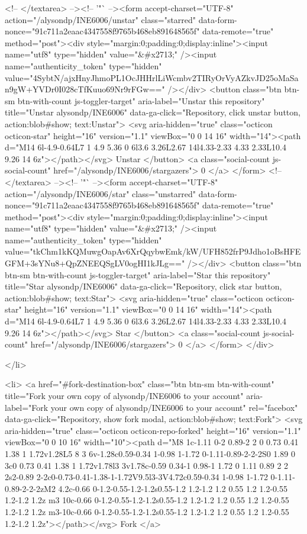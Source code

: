     <!-- </textarea> --><!-- '"` --><form accept-charset="UTF-8" action="/alysondp/INE6006/unstar" class="starred" data-form-nonce="91c711a2eaac4347558f9765b468eb891648565f" data-remote="true" method="post"><div style="margin:0;padding:0;display:inline"><input name="utf8" type="hidden" value="&#x2713;" /><input name="authenticity_token" type="hidden" value="4SybtN/ajxHnyJhmoPL1OcJHHrlLiWcmbv2TIRyOrVyAZkvJD25oMaSan9gW+YVDr0I028cTfKuuo69Nr9rFGw==" /></div>
      <button
        class="btn btn-sm btn-with-count js-toggler-target"
        aria-label="Unstar this repository" title="Unstar alysondp/INE6006"
        data-ga-click="Repository, click unstar button, action:blob#show; text:Unstar">
        <svg aria-hidden="true" class="octicon octicon-star" height="16" version="1.1" viewBox="0 0 14 16" width="14"><path d="M14 6l-4.9-0.64L7 1 4.9 5.36 0 6l3.6 3.26L2.67 14l4.33-2.33 4.33 2.33L10.4 9.26 14 6z"></path></svg>
        Unstar
      </button>
        <a class="social-count js-social-count" href="/alysondp/INE6006/stargazers">
          0
        </a>
</form>
    <!-- </textarea> --><!-- '"` --><form accept-charset="UTF-8" action="/alysondp/INE6006/star" class="unstarred" data-form-nonce="91c711a2eaac4347558f9765b468eb891648565f" data-remote="true" method="post"><div style="margin:0;padding:0;display:inline"><input name="utf8" type="hidden" value="&#x2713;" /><input name="authenticity_token" type="hidden" value="tkChm1kKQMuwgOapAv6XrQqybwEmk/kW/UFH852frP9Jdho1oBsHFEGFM+3sYNu8+QpZNEEQSgLV0ogHI1kJLg==" /></div>
      <button
        class="btn btn-sm btn-with-count js-toggler-target"
        aria-label="Star this repository" title="Star alysondp/INE6006"
        data-ga-click="Repository, click star button, action:blob#show; text:Star">
        <svg aria-hidden="true" class="octicon octicon-star" height="16" version="1.1" viewBox="0 0 14 16" width="14"><path d="M14 6l-4.9-0.64L7 1 4.9 5.36 0 6l3.6 3.26L2.67 14l4.33-2.33 4.33 2.33L10.4 9.26 14 6z"></path></svg>
        Star
      </button>
        <a class="social-count js-social-count" href="/alysondp/INE6006/stargazers">
          0
        </a>
</form>  </div>

  </li>

  <li>
          <a href="#fork-destination-box" class="btn btn-sm btn-with-count"
              title="Fork your own copy of alysondp/INE6006 to your account"
              aria-label="Fork your own copy of alysondp/INE6006 to your account"
              rel="facebox"
              data-ga-click="Repository, show fork modal, action:blob#show; text:Fork">
              <svg aria-hidden="true" class="octicon octicon-repo-forked" height="16" version="1.1" viewBox="0 0 10 16" width="10"><path d="M8 1c-1.11 0-2 0.89-2 2 0 0.73 0.41 1.38 1 1.72v1.28L5 8 3 6v-1.28c0.59-0.34 1-0.98 1-1.72 0-1.11-0.89-2-2-2S0 1.89 0 3c0 0.73 0.41 1.38 1 1.72v1.78l3 3v1.78c-0.59 0.34-1 0.98-1 1.72 0 1.11 0.89 2 2 2s2-0.89 2-2c0-0.73-0.41-1.38-1-1.72V9.5l3-3V4.72c0.59-0.34 1-0.98 1-1.72 0-1.11-0.89-2-2-2zM2 4.2c-0.66 0-1.2-0.55-1.2-1.2s0.55-1.2 1.2-1.2 1.2 0.55 1.2 1.2-0.55 1.2-1.2 1.2z m3 10c-0.66 0-1.2-0.55-1.2-1.2s0.55-1.2 1.2-1.2 1.2 0.55 1.2 1.2-0.55 1.2-1.2 1.2z m3-10c-0.66 0-1.2-0.55-1.2-1.2s0.55-1.2 1.2-1.2 1.2 0.55 1.2 1.2-0.55 1.2-1.2 1.2z"></path></svg>
            Fork
          </a>

